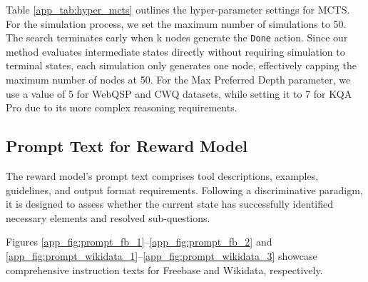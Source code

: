 \begin{table}
\centering
\caption{Hyper-parameter settings for MCTS.}
\label{app_tab:hyper_mcts}
\end{table}

Table \ref{app_tab:hyper_mcts} outlines the hyper-parameter settings for MCTS. For the simulation process, we set the maximum number of simulations to 50. 
The search terminates early when k nodes generate the \texttt{Done} action.
Since our method evaluates intermediate states directly without requiring simulation to terminal states, each simulation only generates one node, effectively capping the maximum number of nodes at 50. For the Max Preferred Depth parameter, we use a value of 5 for WebQSP and CWQ datasets, while setting it to 7 for KQA Pro due to its more complex reasoning requirements.


\subsection{Prompt Text for Reward Model}
\label{app_sec:reward_prompt}

The reward model's prompt text comprises tool descriptions, examples, guidelines, and output format requirements. Following a discriminative paradigm, it is designed to assess whether the current state has successfully identified necessary elements and resolved sub-questions.

Figures \ref{app_fig:prompt_fb_1}--\ref{app_fig:prompt_fb_2} and \ref{app_fig:prompt_wikidata_1}--\ref{app_fig:prompt_wikidata_3} showcase comprehensive instruction texts for Freebase and Wikidata, respectively.

